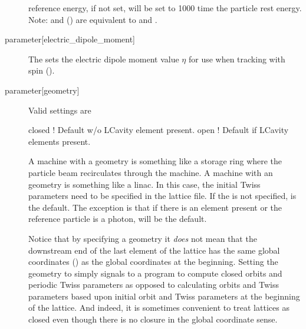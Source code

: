 \begin{description}
reference energy, if not set, will be set to 1000 time the particle
rest energy.  Note:  and  () are
equivalent to  and .
  \item[{parameter[electric_dipole_moment]}] \Newline
The  sets the electric dipole moment value $\eta$ for use
when tracking with spin (). 
  \item[{parameter[geometry]}] \Newline
Valid  settings are
\begin{example}
  closed  ! Default w/o LCavity element present.
  open    ! Default if LCavity elements present.
\end{example}
A machine with a  geometry is something like a storage ring
where the particle beam recirculates through the machine.  A machine
with an  geometry is something like a linac.  In this case,
the initial Twiss parameters need to be specified in the lattice
file. If the  is not specified,  is the
default. The exception is that if there is an  element
present or the reference particle is a photon,  will be the
default.

Notice that by specifying a  geometry it {\em does} not
mean that the downstream end of the last element of the lattice has
the same global coordinates () as the global
coordinates at the beginning. Setting the geometry to 
simply signals to a program to compute closed orbits and periodic
Twiss parameters as opposed to calculating orbits and Twiss parameters
based upon initial orbit and Twiss parameters at the beginning of the
lattice. And indeed, it is sometimes convenient to treat lattices as
closed even though there is no closure in the global coordinate sense.


\end{description}
